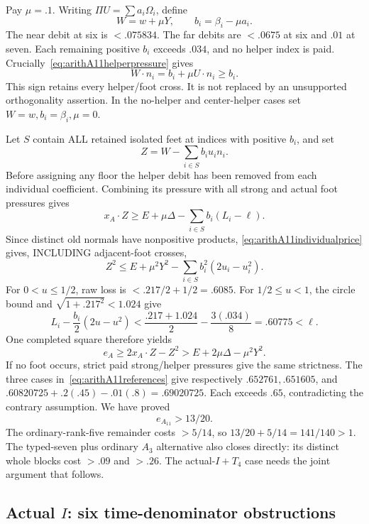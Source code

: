 \documentclass[11pt]{article}
\begin{document}
Pay \(\mu=.1\).
Writing \(\Pi U=\sum a_i\Omega_i\), define
\[
 W=w+\mu Y,\qquad b_i=\beta_i-\mu a_i .
\]
The near debit at six is \(<.075834\).
The far debits are \(<.0675\) at six and
\(.01\) at seven.
Each remaining positive \(b_i\) exceeds
\(.034\), and no helper index is paid.
Crucially~\eqref{eq:arithA11helperpressure} gives
\[
                  W\cdot n_i=b_i+\mu U\cdot n_i\ge b_i.
\tag{A11price}\label{eq:arithA11individualprice}
\]
This sign retains every helper/foot cross.
It is not replaced by an unsupported
orthogonality assertion.
In the no-helper and center-helper cases set
\(W=w,b_i=\beta_i,\mu=0\).

Let \(S\) contain ALL retained isolated feet
at indices with positive \(b_i\), and set
\[
                  Z=W-\sum_{i\in S}b_i u_i n_i .
\]
Before assigning any floor the helper debit
has been removed from each individual
coefficient.  Combining its pressure with
all strong and actual foot pressures gives
\[
 x_A\cdot Z\ge E+\mu\Delta
                    -\sum_{i\in S}b_i(L_i-\ell).
\]
Since distinct old normals have nonpositive
products, \eqref{eq:arithA11individualprice}
gives, INCLUDING adjacent-foot crosses,
\[
 Z^2\le E+\mu^2Y^2
                    -\sum_{i\in S}b_i^2(2u_i-u_i^2).
\]
For \(0<u\le1/2\), raw loss is
\(<.217/2+1/2=.6085\).
For \(1/2\le u<1\), the circle bound and
\(\sqrt{1+.217^2}<1.024\) give
\[
 L_i-\frac{b_i}{2}(2u-u^2)
 <{\frac{.217+1.024}{2}}-{\frac{3(.034)}{8}}
 =.60775<\ell .
\]
One completed square therefore yields
\[
 e_A\ge2x_A\cdot Z-Z^2
                      >E+2\mu\Delta-\mu^2Y^2 .
\]
If no foot occurs, strict paid strong/helper
pressures give the same strictness.
The three cases in~\eqref{eq:arithA11references}
give respectively
\(.652761,.651605\), and
\(.60820725+.2(.45)-.01(.8)=.69020725\).
Each exceeds \(.65\), contradicting the
contrary assumption.  We have proved
\[
                            e_{A_{11}}>13/20 .
\tag{A11Urate}\label{eq:arithA11uniform}
\]
The ordinary-rank-five remainder costs \(>5/14\),
so \(13/20+5/14=141/140>1\).
The typed-seven plus ordinary \(A_3\) alternative
also closes directly: its distinct whole
blocks cost \(>.09\) and \(>.26\).
The actual-\(I+T_4\) case needs the joint
argument that follows.

\subsection[Actual I: six time-denominator obstructions]{Actual \(I\): six time-denominator obstructions}
\label{app:arithA11Itimes}
\end{document}
